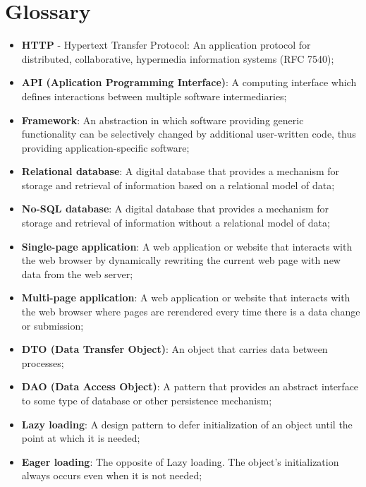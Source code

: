\chapter*{Glossary}

\begin{itemize}
    \item \textbf{HTTP} - Hypertext Transfer Protocol: An application protocol for distributed,
     collaborative, hypermedia information systems (RFC 7540);
    \item \textbf{API (Aplication Programming Interface)}: A computing interface which defines
     interactions between multiple software intermediaries;
    \item \textbf{Framework}: An abstraction in which software providing generic functionality can
     be selectively changed by additional user-written code,
     thus providing application-specific software;
     \item \textbf{Relational database}: A digital database that provides a mechanism for storage and
     retrieval of information based on a relational model of data;
     \item \textbf{No-SQL database}: A digital database that provides a mechanism for storage and
     retrieval of information without a relational model of data;
     \item \textbf{Single-page application}: A web application or website that interacts with the web browser by dynamically
     rewriting the current web page with new data from the web server;
     \item \textbf{Multi-page application}: A web application or website that interacts with the web browser where pages
     are rerendered every time there is a data change or submission;
     \item \textbf{DTO (Data Transfer Object)}: An object that carries data between processes;
     \item \textbf{DAO (Data Access Object)}: A pattern that provides an abstract interface to  
     some type of database or other persistence mechanism;
     \item \textbf{Lazy loading}: A design pattern to defer initialization of an object until the point at which it is needed;
     \item \textbf{Eager loading}: The opposite of Lazy loading. The object's initialization always occurs even when it is not needed;
\end{itemize}